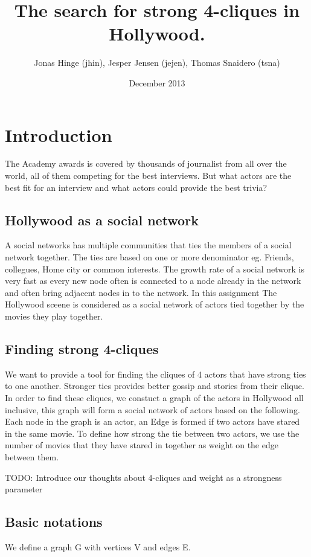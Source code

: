 \documentclass{article}
\title{The search for strong 4-cliques in Hollywood.}
\author{Jonas Hinge (jhin), Jesper Jensen (jejen),  Thomas Snaidero (tsna)}
\date{December 2013}
\begin{document}
\maketitle

\section{Introduction}
The Academy awards is covered by thousands of journalist from all over the world, all of them competing for the best interviews. But what actors are the best fit for an interview and what actors could provide the best trivia?

\subsection{Hollywood as a social network}
A social networks has multiple communities that ties the members of a social network together. The ties are based on one or more denominator eg. Friends, collegues, Home city or common interests.
The growth rate of a social network is very fast as every new node often is connected to a node already in the network and often bring adjacent nodes in to the network. In this assignment The Hollywood sceene is considered as a social network of actors tied together by the movies they play together.


\subsection{Finding strong 4-cliques}
We want to provide a tool for finding the cliques of 4 actors that have strong ties to one another. Stronger ties provides better gossip and stories from their clique. In order to find these cliques, we constuct a graph of the actors in Hollywood all inclusive, this graph will form a social network of actors based on the following.
Each node in the graph is an actor, an Edge is formed if two actors have stared in the same movie. To define how strong the tie between two actors, we use the number of movies that they have stared in together as weight on the edge between them.

TODO: Introduce our thoughts about 4-cliques and weight as a strongness parameter

\subsection{Basic notations}
We define a graph G with vertices V and edges E.
\end{document}
